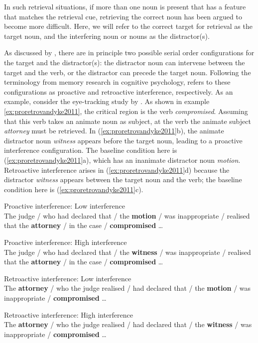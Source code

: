 \documentclass{cambridge7A}\usepackage[]{graphicx}\usepackage[]{color}
\begin{document}
In such retrieval situations, if more than one noun is present that has a feature that matches the retrieval cue, retrieving the correct noun has been argued to become more difficult.  Here, we will refer to the correct target for retrieval as the target noun, and the interfering noun or nouns as the distractor(s). 
  
As discussed by \cite{lewis:magical},  there are in principle two possible serial order configurations for the target and the distractor(s): the distractor  noun can intervene between the target and the verb, or the distractor can precede the target noun.
Following the terminology from memory research in cognitive psychology, \cite{lewis:magical} refers to these configurations  as  proactive  and retroactive interference, respectively. 
As an example, consider the eye-tracking study by
\cite{VanDykeMcElree2011}.
As shown in example \ref{ex:proretrovandyke2011}, the critical region is the verb \textit{compromised}.
Assuming that this verb takes an animate noun as subject, 
at the verb the animate subject \textit{attorney} must be retrieved. In 
(\ref{ex:proretrovandyke2011}b), the animate distractor noun \textit{witness} appears before the target noun, leading to a proactive interference configuration. The baseline condition here is (\ref{ex:proretrovandyke2011}a), which has an inanimate distractor noun \textit{motion}.   
Retroactive interference arises in (\ref{ex:proretrovandyke2011}d) because the distractor \textit{witness} appears between the target noun and the verb; the baseline condition here is (\ref{ex:proretrovandyke2011}c).


\begin{exe}
\ex \label{ex:proretrovandyke2011}
\begin{xlist}
\item Proactive interference: Low interference\\
The judge / who had declared that / the \textbf{motion} / was inappropriate / realised that the \textbf{attorney} / in the case / \textbf{compromised} \dots
\item Proactive interference: High interference\\
The judge / who had declared that / the \textbf{witness} / was inappropriate / realised that the \textbf{attorney} / in the case / \textbf{compromised} \dots
\item Retroactive interference: Low interference \\
The \textbf{attorney} / who the judge realised / had declared that / the \textbf{motion} / was inappropriate / \textbf{compromised} \dots
\item Retroactive interference: High interference \\
The \textbf{attorney} / who the judge realised / had declared that / the \textbf{witness} / was inappropriate / \textbf{compromised} \dots
\end{xlist}
\end{exe}
\end{document}
